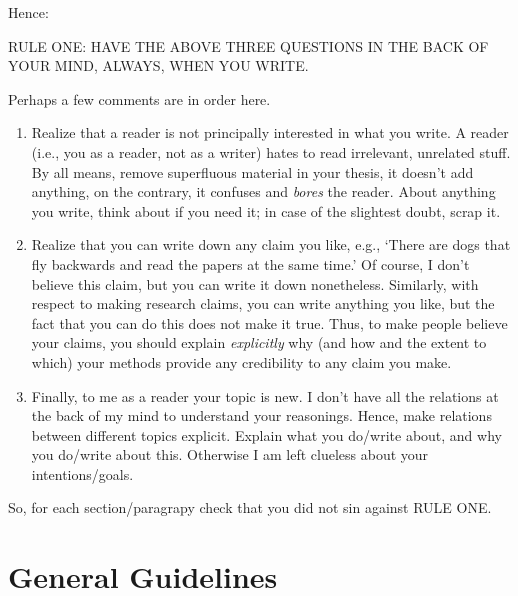 \documentclass{article}
\begin{document}
Hence: 
\begin{center}
RULE ONE: HAVE THE ABOVE THREE QUESTIONS IN THE BACK OF YOUR MIND, ALWAYS, WHEN YOU WRITE.
\end{center}

Perhaps a few comments are in order here. 
\begin{enumerate}
\item Realize that a reader is not principally interested in what you
  write.  A reader (i.e., you as a reader, not as a writer) hates to
  read irrelevant, unrelated stuff. By all means, remove superfluous
  material in your thesis, it doesn't add anything, on the contrary,
  it confuses and \emph{bores} the reader. About anything you write,
  think about if you need it; in case of the slightest doubt, scrap
  it.
\item Realize that you can write down any claim you like, e.g., `There
  are dogs that fly backwards and read the papers at the same time.'
  Of course, I don't believe this claim, but you can write it down
  nonetheless. Similarly, with respect to making research claims, you
  can write anything you like, but the fact that you can do this
  does not make it true. Thus, to make people believe your claims, you
  should explain \emph{explicitly} why (and how and the extent to
  which) your methods provide any credibility to any claim you make.
\item Finally, to me as a reader your topic is new. I don't have all
  the relations at the back of my mind to understand your
  reasonings. Hence, make relations between different topics
  explicit. Explain what you do/write about, and why you do/write about
  this. Otherwise I am left clueless about your intentions/goals.
\end{enumerate}

So, for each section/paragrapy check that you did not sin against RULE
ONE.


\section{General Guidelines}
\label{sec:most-important-rule}
\end{document}
